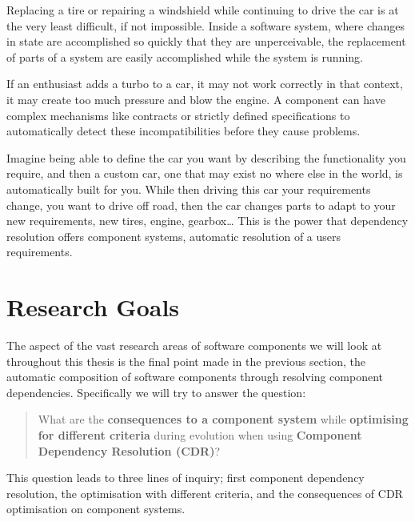 \documentclass{report}
\begin{document}
Replacing a tire or repairing a windshield while continuing to drive the car is at the very least difficult, if not impossible.
Inside a software system, where changes in state are accomplished so quickly that they are unperceivable, the replacement of parts of a system are easily accomplished while the system is running.

If an enthusiast adds a turbo to a car, it may not work correctly in that context, it may create too much pressure and blow the engine.
A component can have complex mechanisms like contracts or strictly defined specifications to automatically detect these incompatibilities before they cause problems.

Imagine being able to define the car you want by describing the functionality you require, and then a custom car, one that may exist no where else in the world,
is automatically built for you. 
While then driving this car your requirements change, you want to drive off road, then the car changes parts to adapt to your new requirements, new tires, engine, gearbox\ldots
This is the power that dependency resolution offers component systems, automatic resolution of a users requirements.

\section{Research Goals}
{}The aspect of the vast research areas of software components we will look at throughout this thesis is the final point made in the previous section, 
{}the automatic composition of software components through resolving component dependencies.
{}Specifically we will try to answer the question:\\
{}\begin{quote}
{}What are the \textbf{consequences to a component system} while \textbf{optimising for different criteria} during evolution when using \textbf{Component Dependency Resolution (CDR)}?
{}\end{quote}

{}This question leads to three lines of inquiry; first component dependency resolution, the optimisation with different criteria, and the consequences of CDR optimisation on component systems.
\end{document}
